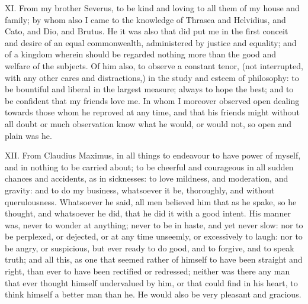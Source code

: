 XI. From my brother Severus, to be kind and loving to all them of my
house and family; by whom also I came to the knowledge of Thrasea and
Helvidius, and Cato, and Dio, and Brutus. He it was also that did put me
in the first conceit and desire of an equal commonwealth, administered by
justice and equality; and of a kingdom wherein should be regarded nothing
more than the good and welfare of the subjects. Of him also, to observe a
constant tenor, (not interrupted, with any other cares and distractions,)
in the study and esteem of philosophy: to be bountiful and liberal in the
largest measure; always to hope the best; and to be confident that my
friends love me. In whom I moreover observed open dealing towards those
whom he reproved at any time, and that his friends might without all doubt
or much observation know what he would, or would not, so open and plain
was he.

XII. From Claudius Maximus, in all things to endeavour to have power
of myself, and in nothing to be carried about; to be cheerful and
courageous in all sudden chances and accidents, as in sicknesses: to love
mildness, and moderation, and gravity: and to do my business, whatsoever
it be, thoroughly, and without querulousness. Whatsoever he said, all men
believed him that as he spake, so he thought, and whatsoever he did, that
he did it with a good intent. His manner was, never to wonder at anything;
never to be in haste, and yet never slow: nor to be perplexed, or
dejected, or at any time unseemly, or excessively to laugh: nor to be
angry, or suspicious, but ever ready to do good, and to forgive, and to
speak truth; and all this, as one that seemed rather of himself to have
been straight and right, than ever to have been rectified or redressed;
neither was there any man that ever thought himself undervalued by him, or
that could find in his heart, to think himself a better man than he. He
would also be very pleasant and gracious.

